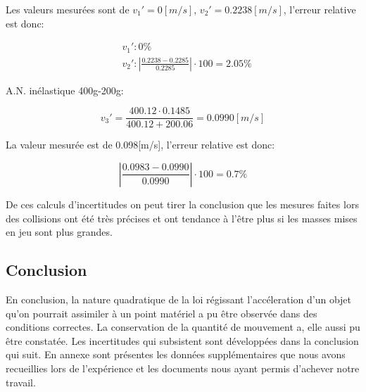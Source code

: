 Les valeurs mesurées sont de $v_1' = 0 [m/s]$, $v_2' = 0.2238[m/s]$, l'erreur relative est donc:

\begin{align}
    & v_1' : 0\%\\
    & v_2' : |\frac{0.2238-0.2285}{0.2285}|\cdot 100 = 2.05\%
\end{align}

A.N. inélastique 400g-200g:

\begin{equation}
    v_3' = \frac{400.12\cdot 0.1485}{400.12 + 200.06} = 0.0990[m/s]
\end{equation}

La valeur mesurée est de 0.098[m/s], l'erreur relative est donc:

\begin{equation}
    |\frac{0.0983-0.0990}{0.0990}|\cdot 100 = 0.7\%
\end{equation}

De ces calculs d'incertitudes on peut tirer la conclusion que les mesures faites lors des collisions ont été très précises et ont tendance à l'être plus si les masses mises en jeu sont plus grandes.

\subsection{Conclusion}
En conclusion, la nature quadratique de la loi régissant l'accéleration d'un objet qu'on pourrait assimiler à un point matériel a pu être observée dans des conditions correctes.
La conservation de la quantité de mouvement a, elle aussi pu être constatée. Les incertitudes qui subsistent sont développées dans la conclusion qui suit.
En annexe sont présentes les données supplémentaires que nous avons recueillies lors de l'expérience et les documents nous ayant permis d'achever notre travail.
